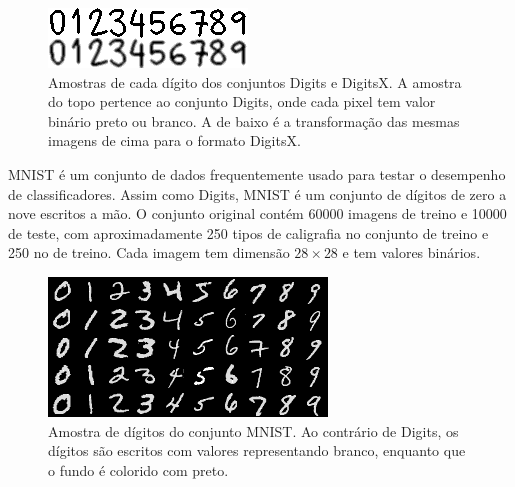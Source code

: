 \documentclass[12pt]{article}
\theoremstyle{plain}
\numberwithin{equation}{section}
\begin{document}
\begin{figure}[h]
  \centering\includegraphics[scale=1.5]{imgs/digits_sample.png}
  \captionsetup{justification=raggedright}
  \caption{Amostras de cada dígito dos conjuntos Digits e DigitsX. A amostra do topo pertence ao
    conjunto Digits, onde cada pixel tem valor binário preto ou branco. A de baixo é a
    transformação das mesmas imagens de cima para o formato DigitsX.}
\end{figure}

MNIST é um conjunto de dados frequentemente usado para testar o desempenho de classificadores.
Assim como Digits, MNIST é um conjunto de dígitos de zero a nove escritos a mão. O conjunto
original contém 60000 imagens de treino e 10000 de teste, com aproximadamente 250 tipos de
caligrafia no conjunto de treino e 250 no de treino. Cada imagem tem dimensão $28\times 28$ e tem
valores binários.

\begin{figure}[h]
  \centering\includegraphics[scale=1.0]{imgs/mnist_sample.png}
  \captionsetup{justification=raggedright}
  \caption{Amostra de dígitos do conjunto MNIST\@. Ao contrário de Digits, os dígitos são escritos
    com valores representando branco, enquanto que o fundo é colorido com preto.}
\end{figure}


\end{document}
